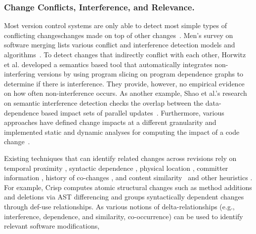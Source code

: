 \documentclass[runningheads,a4paper]{llncs}
\begin{document}


\subsubsection{Change Conflicts, Interference, and Relevance. } 
Most version control systems are only able to detect most simple types of conflicting changes\textemdash changes made on top of other changes~\cite{mens:survey02}. Men's survey on software merging lists various conflict and interference detection models and algorithms~\cite{mens:survey02}. To detect changes that indirectly conflict with each other, Horwitz et al. developed a semantics based tool that automatically integrates non-interfering versions by using program slicing on program dependence graphs to determine if there is interference. They provide, however, no empirical evidence on how often non-interference occurs. As another example, Shao et al.'s research on semantic interference detection checks the overlap between the data-dependence based impact sets of parallel updates~\cite{Shao2007:interference}.  Furthermore, various approaches have defined change impacts at a different granularity and implemented static and dynamic analyses for computing the impact of a code change~\cite{Apiwattanapong2005, Arnold1996:impact, Elbaum2001,Orso:2003, Orso2004:impact, Ren2004}.  

Existing techniques that can identify related changes across revisions rely on temporal proximity \cite{Bevan2005, Fischer2003, German2004:softchange, Zimmermann2004b}, syntactic dependence \cite{Chesley2005}, physical location \cite{Zeller1999}, committer information \cite{Fischer2003, German2004:softchange, Zimmermann2004b}, history of co-changes \cite{Gall1998, Ying2004, Zimmermann2004}, and content similarity~\cite{Kim:2009,NNP2009} and other heuristics \cite{Zeller1999}. For example, Crisp \cite{Chesley2005} computes atomic structural changes such as method additions and deletions via AST differencing and groups syntactically dependent changes through def-use relationships. As various notions of delta-relationships (e.g., interference, dependence, and similarity, co-occurrence) can be used to identify relevant software modifications,  
\end{document}

